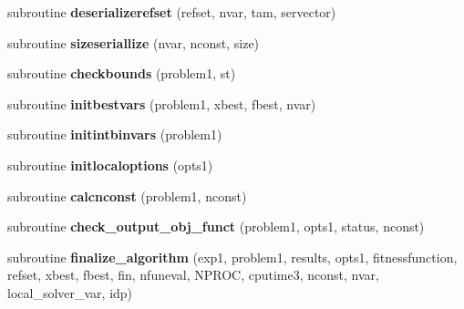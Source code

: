 \begin{DoxyCompactItemize}
\item 
\hypertarget{classscattersearchfunctions_aaec5333de3c4eca7edec00b1829112fd}{subroutine {\bfseries deserializerefset} (refset, nvar, tam, servector)}\label{classscattersearchfunctions_aaec5333de3c4eca7edec00b1829112fd}

\item 
\hypertarget{classscattersearchfunctions_a856a43dd09b27e006bcad1a502e97129}{subroutine {\bfseries sizeseriallize} (nvar, nconst, size)}\label{classscattersearchfunctions_a856a43dd09b27e006bcad1a502e97129}

\item 
\hypertarget{classscattersearchfunctions_ade544bac611e11bf6d43b2c2148c5ede}{subroutine {\bfseries checkbounds} (problem1, st)}\label{classscattersearchfunctions_ade544bac611e11bf6d43b2c2148c5ede}

\item 
\hypertarget{classscattersearchfunctions_aeb17409fc6e2c59bdf69a41e6afb2f32}{subroutine {\bfseries initbestvars} (problem1, xbest, fbest, nvar)}\label{classscattersearchfunctions_aeb17409fc6e2c59bdf69a41e6afb2f32}

\item 
\hypertarget{classscattersearchfunctions_a10e9a0ce44b273348f5c8d2cc0a1a3f3}{subroutine {\bfseries initintbinvars} (problem1)}\label{classscattersearchfunctions_a10e9a0ce44b273348f5c8d2cc0a1a3f3}

\item 
\hypertarget{classscattersearchfunctions_ae17b6306784beeef4a724a995f0accb8}{subroutine {\bfseries initlocaloptions} (opts1)}\label{classscattersearchfunctions_ae17b6306784beeef4a724a995f0accb8}

\item 
\hypertarget{classscattersearchfunctions_a097f6f3316f76685e5c8de72836967e9}{subroutine {\bfseries calcnconst} (problem1, nconst)}\label{classscattersearchfunctions_a097f6f3316f76685e5c8de72836967e9}

\item 
\hypertarget{classscattersearchfunctions_a71ab78e6a7f377acbc57203c1be47a17}{subroutine {\bfseries check\-\_\-output\-\_\-obj\-\_\-funct} (problem1, opts1, status, nconst)}\label{classscattersearchfunctions_a71ab78e6a7f377acbc57203c1be47a17}

\item 
\hypertarget{classscattersearchfunctions_a83be4a09add7c1cfcf5a0316df27ba61}{subroutine {\bfseries finalize\-\_\-algorithm} (exp1, problem1, results, opts1, fitnessfunction, refset, xbest, fbest, fin, nfuneval, N\-P\-R\-O\-C, cputime3, nconst, nvar, local\-\_\-solver\-\_\-var, idp)}\label{classscattersearchfunctions_a83be4a09add7c1cfcf5a0316df27ba61}


\end{DoxyCompactItemize}
